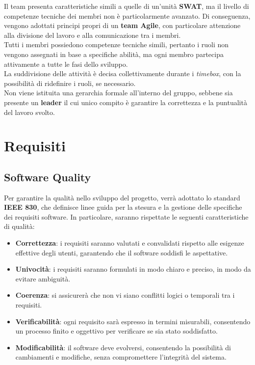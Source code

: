 \documentclass[a4paper,12pt]{article}
\begin{document}
Il team presenta caratteristiche simili a quelle di un'unità \textbf{SWAT}, ma il livello di competenze tecniche dei membri non è particolarmente avanzato.  
Di conseguenza, vengono adottati principi propri di un \textbf{team Agile}, con particolare attenzione alla divisione del lavoro e alla comunicazione tra i membri.  \\
Tutti i membri possiedono competenze tecniche simili, pertanto i ruoli non vengono assegnati in base a specifiche abilità, ma ogni membro partecipa attivamente a tutte le fasi dello sviluppo.\\  
La suddivisione delle attività è decisa collettivamente durante i \emph{timebox}, con la possibilità di ridefinire i ruoli, se necessario.  \\
Non viene istituita una gerarchia formale all'interno del gruppo, sebbene sia presente un \textbf{leader} il cui unico compito è garantire la correttezza e la puntualità del lavoro svolto.
\newpage

\section{Requisiti}
\subsection{Software Quality}
Per garantire la qualità nello sviluppo del progetto, verrà adottato lo standard \textbf{IEEE 830}, che definisce linee guida per la stesura e la gestione delle specifiche dei requisiti software. In particolare, saranno rispettate le seguenti caratteristiche di qualità:

\begin{itemize}
    \item \textbf{Correttezza}: i requisiti saranno valutati e convalidati rispetto alle esigenze effettive degli utenti, garantendo che il software soddisfi le aspettative.
    \item \textbf{Univocità}: i requisiti saranno formulati in modo chiaro e preciso, in modo da evitare ambiguità.
    \item \textbf{Coerenza}: si assicurerà che non vi siano conflitti logici o temporali tra i requisiti.
    \item \textbf{Verificabilità}: ogni requisito sarà espresso in termini misurabili, consentendo un processo finito e oggettivo per verificare se sia stato soddisfatto.
    \item \textbf{Modificabilità}: il software deve evolversi, consentendo la possibilità di cambiamenti e modifiche, senza compromettere l’integrità del sistema.
\end{itemize}
\end{document}
